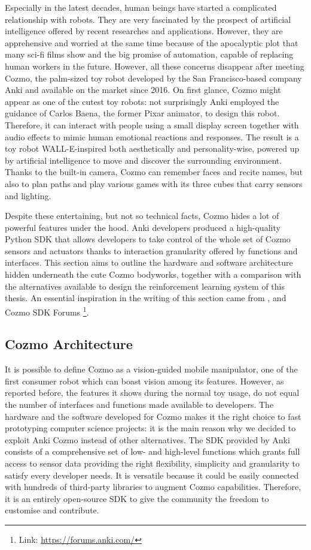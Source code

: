 Especially in the latest decades, human beings have started a complicated relationship with robots. They are very fascinated by the prospect of artificial intelligence offered by recent researches and applications. However, they are apprehensive and worried at the same time because of the apocalyptic plot that many sci-fi films show and the big promise of automation, capable of replacing human workers in the future.
However, all these concerns disappear after meeting Cozmo, the palm-sized toy robot developed by the San Francisco-based company Anki and available on the market since 2016.
On first glance, Cozmo might appear as one of the cutest toy robots: not surprisingly Anki employed the guidance of Carlos Baena, the former Pixar animator, to design this robot.
Therefore, it can interact with people using a small display screen together with audio effects to mimic human emotional reactions and responses.
The result is a toy robot WALL-E-inspired both aesthetically and personality-wise, powered up by artificial intelligence to move and discover the surrounding environment. Thanks to the built-in camera, Cozmo can remember faces and recite names, but also to plan paths and play various games with its three cubes that carry sensors and lighting.

Despite these entertaining, but not so technical facts, Cozmo hides a lot of powerful features under the hood. Anki developers produced a high-quality Python SDK that allows developers to take control of the whole set of Cozmo sensors and actuators thanks to interaction granularity offered by functions and interfaces.
This section aims to outline the hardware and software architecture hidden underneath the cute Cozmo bodyworks, together with a comparison with the alternatives available to design the reinforcement learning system of this thesis. An essential inspiration in the writing of this section came from \cite{mellon2017cognitive}, \cite{touretzky2018cozmopedia} and Cozmo SDK Forums \footnote{Link: \href{https://forums.anki.com/}{https://forums.anki.com/}}.

\subsection{Cozmo Architecture}

It is possible to define Cozmo as a vision-guided mobile manipulator, one of the first consumer robot which can boast vision among its features. However, as reported before, the features it shows during the normal toy usage, do not equal the number of interfaces and functions made available to developers. The hardware and the software developed for Cozmo makes it the right choice to fast prototyping computer science projects: it is the main reason why we decided to exploit Anki Cozmo instead of other alternatives.
The SDK provided by Anki consists of a comprehensive set of low- and high-level functions which grants full access to sensor data providing the right flexibility, simplicity and granularity to satisfy every developer needs. It is versatile because it could be easily connected with hundreds of third-party libraries to augment Cozmo capabilities. Therefore, it is an entirely open-source SDK to give the community the freedom to customise and contribute.

